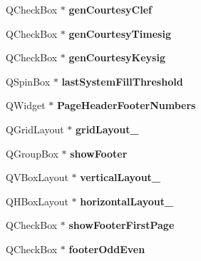 \begin{DoxyCompactItemize}
Q\+Check\+Box $\ast$ {\bfseries gen\+Courtesy\+Clef}
\item 
\mbox{\label{class_ui___edit_style_base_a2a4f03b4d26a295a19388538e276a5dc}} 
Q\+Check\+Box $\ast$ {\bfseries gen\+Courtesy\+Timesig}
\item 
\mbox{\label{class_ui___edit_style_base_a8b4998ac235b8d4fedfadc9abe23ed5c}} 
Q\+Check\+Box $\ast$ {\bfseries gen\+Courtesy\+Keysig}
\item 
\mbox{\label{class_ui___edit_style_base_a40f3ea2a563038a24a41962de8682ab2}} 
Q\+Spin\+Box $\ast$ {\bfseries last\+System\+Fill\+Threshold}
\item 
\mbox{\label{class_ui___edit_style_base_a1b2d0ebb7e51ad0c3def5a8812dca8dd}} 
Q\+Widget $\ast$ {\bfseries Page\+Header\+Footer\+Numbers}
\item 
\mbox{\label{class_ui___edit_style_base_aa625141618f81b00e2051817a88807b7}} 
Q\+Grid\+Layout $\ast$ {\bfseries grid\+Layout\+\_}
\item 
\mbox{\label{class_ui___edit_style_base_a182fa5308f6700defda3d0a67eed0ba6}} 
Q\+Group\+Box $\ast$ {\bfseries show\+Footer}
\item 
\mbox{\label{class_ui___edit_style_base_ab820493dfc3b0c8def7235c5a53b19e9}} 
Q\+V\+Box\+Layout $\ast$ {\bfseries vertical\+Layout\+\_}
\item 
\mbox{\label{class_ui___edit_style_base_afcbb937454c85b4a53b008c6e5e1f1a8}} 
Q\+H\+Box\+Layout $\ast$ {\bfseries horizontal\+Layout\+\_}
\item 
\mbox{\label{class_ui___edit_style_base_a9d98d619364d611cd440d269fa69f42a}} 
Q\+Check\+Box $\ast$ {\bfseries show\+Footer\+First\+Page}
\item 
\mbox{\label{class_ui___edit_style_base_a6ace15fe59be560aa7163b86debd7ae2}} 
Q\+Check\+Box $\ast$ {\bfseries footer\+Odd\+Even}

\end{DoxyCompactItemize}
